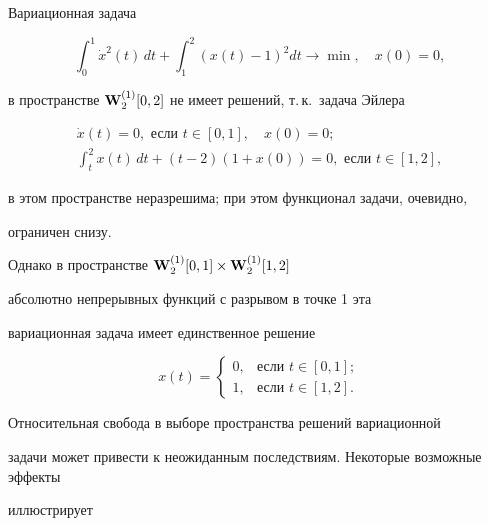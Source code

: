\begin{exam} Вариационная задача


$$


\int_0^1\Dot x^2(t)\,dt+\int_1^2(x(t)-1)^2dt


\longrightarrow\min,\quad x(0)=0,


$$


в пространстве $\bold W{}_2^{(1)}[0,2]$ не имеет решений, т.\,к.~задача Эйлера


\begin{gather*}


\Dot x(t)=0,\text{ если }t\in[0,1],\quad x(0)=0;\\


\int_t^2x(t)\,dt+(t-2)(1+x(0))=0,\text{ если }t\in[1,2],


\end{gather*}


в этом пространстве неразрешима; при этом функционал задачи, очевидно,


ограничен снизу.


Однако в пространстве $\bold W{}_2^{(1)}[0,1]\times\bold W{}_2^{(1)}[1,2]$


абсолютно непрерывных функций с разрывом в точке 1 эта


вариационная задача имеет единственное решение


$$


x(t)=


\begin{cases}


0,&\text{если }t\in[0,1];\\


1,&\text{если }t\in[1,2].


\end{cases}


$$


\end{exam}





Относительная свобода в выборе пространства решений вариационной


задачи может привести к неожиданным последствиям. Некоторые возможные эффекты


иллюстрирует





